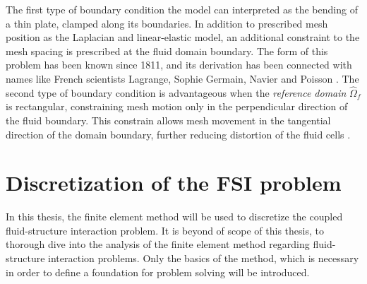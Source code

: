 The first type of boundary condition the model can interpreted as the bending of a thin plate, clamped along its boundaries. In addition to prescribed mesh position as the  Laplacian and linear-elastic model, an additional constraint to the mesh spacing is prescribed at the fluid domain boundary. The form of this problem has been known since 1811, and its derivation has been connected with names like  French scientists Lagrange, Sophie Germain, Navier and Poisson \cite{Meleshko1997}.  
The second type of boundary condition is advantageous when the \textit{reference domain} $\hat{\Omega}_f$ is rectangular, constraining mesh motion only in the perpendicular direction of the fluid boundary. This constrain allows  mesh movement in the tangential direction of the domain boundary, further reducing distortion of the fluid cells  \cite{Wicka}.  
\newpage
\newpage
\section{Discretization of the FSI problem}
In this thesis, the finite element method will be used to discretize the coupled fluid-structure interaction problem. It is beyond of scope  of this thesis, to thorough dive into the analysis of the finite element method regarding fluid-structure interaction problems. Only the basics of the method, which is necessary in order to define a foundation for problem solving will be introduced. 
